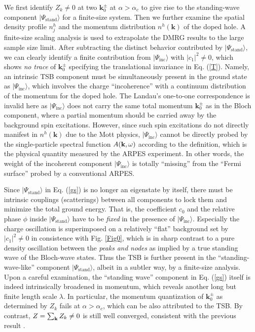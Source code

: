 \documentclass[aps,prb,twocolumn,notitlepage,superscriptaddress,showpacs]{revtex4-1}
\begin{document}
We first identify $Z_k\neq 0$ at two ${\textbf{k}}_0^{\pm}$ at $\alpha>\alpha_c$ to give rise to the standing-wave component $|\Psi_{\mathrm {stand}}\rangle $ for a finite-size system. Then we further examine the spatial density profile $n^h_j$ and the momentum distribution $n^h({\textbf{k}})$ of the doped hole. A finite-size scaling analysis is used to extrapolate the DMRG results to the large sample size limit.  After subtracting the distinct behavior contributed by $|\Psi_{\mathrm {stand}}\rangle $, we can clearly identify a finite contribution from $|\Psi_{\mathrm {inc}}\rangle$ with $|c_1|^2 \neq 0$, which shows \emph{no trace} of ${\textbf{k}}_0^{\pm}$ specifying the translational invariance in Eq. (\ref{T}). Namely, an intrinsic TSB component must be simultaneously present in the ground state as $|\Psi_{\mathrm {inc}}\rangle $, which involves the charge ``incoherence'' with a continuum distribution of the momentum for the doped hole. The Landau's one-to-one correspondence is invalid here as  $|\Psi_{\mathrm {inc}}\rangle $ does not carry the same total momentum ${\textbf{k}}_0^{\pm}$ as in the Bloch component, where a partial momentum should be carried away by the background spin excitations\cite{WZ2018}. However, since such spin excitations do not directly manifest in $n^h({\textbf{k}})$ due to the Mott physics, $|\Psi_{\mathrm {inc}}\rangle $ cannot be directly probed by the single-particle spectral function $A({\textbf k},\omega)$ according to the definition, which is the physical quantity measured by the ARPES experiment. In other words, the weight of the incoherent component $|\Psi_{\mathrm {inc}}\rangle $ is totally ``missing'' from the ``Fermi surface'' probed by a conventional ARPES.

Since $|\Psi_{\mathrm {stand}}\rangle$ in Eq. (\ref{gs}) is no longer an eigenstate by itself, there must be intrinsic couplings (scatterings) between all components to lock them and minimize the total ground energy. That is, the coefficient $c_0$ and the relative phase $\phi$ inside $|\Psi_{\mathrm {stand}}\rangle $ have to be \emph{fixed} in the presence of $|\Psi_{\mathrm {inc}}\rangle $. Especially the charge oscillation is superimposed on a relatively ``flat'' background set by $|c_1|^2\neq 0$ in consistence with Fig. \ref{Fig0}, which is in sharp contrast to a pure density oscillation between the \emph{peaks and nodes} as implied by a true standing wave of the Bloch-wave states. Thus the TSB is further present in the ``standing-wave-like'' component $|\Psi_{\mathrm {stand}}\rangle $, albeit in a subtler way, by a finite-size analysis. Upon a careful examination, the ``standing wave'' component in Eq. (\ref{gs}) itself is indeed intrinsically broadened in momentum, which reveals another long but finite length scale $\lambda$. In particular, the momentum quantization of ${\textbf{k}}_0^{\pm}$ as determined by $Z_k$ fails at $\alpha>\alpha_c$, which can be also attributed to the TSB. By contrast, $Z=\sum_{\textbf k}Z_k\neq 0$ is still well converged, consistent with the previous result \cite{WSK2015}.
\end{document}
